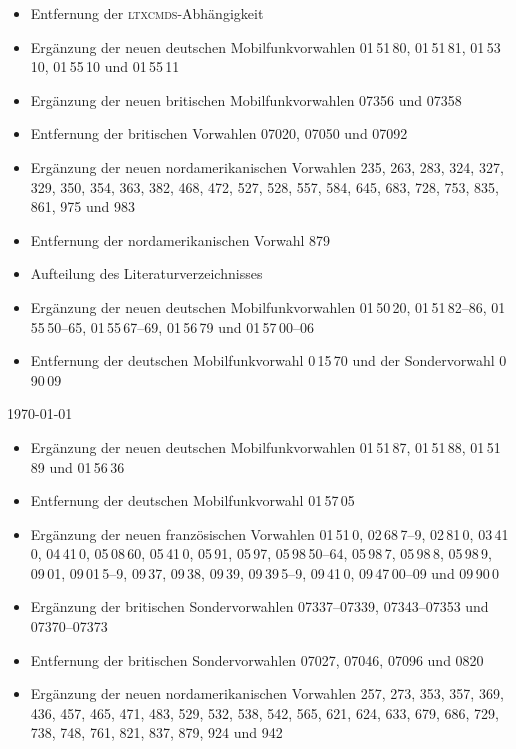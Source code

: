 \documentclass[numbers=noenddot]{scrreprt}
\newcommand*\Paket[1]{\textsc{#1}}
\begin{document}
\begin{description}
\begin{itemize}
\item Entfernung der \Paket{ltxcmds}-Abhängigkeit
\item Ergänzung der neuen deutschen Mobilfunkvorwahlen 01\,51\,80, 01\,51\,81, 01\,53\,10, 01\,55\,10 und 01\,55\,11
\item Ergänzung der neuen britischen Mobilfunkvorwahlen 07356 und 07358
\item Entfernung der britischen Vorwahlen 07020, 07050 und 07092
\item Ergänzung der neuen nordamerikanischen Vorwahlen 235, 263, 283, 324, 327, 329, 350, 354, 363, 382, 468, 472, 527, 528, 557, 584, 645, 683, 728, 753, 835, 861, 975 und 983
\item Entfernung der nordamerikanischen Vorwahl 879
\item Aufteilung des Literaturverzeichnisses
\end{itemize}
\item[2.6] 
\begin{itemize}
\item Ergänzung der neuen deutschen Mobilfunkvorwahlen 01\,50\,20, 01\,51\,82--86, 01\,55\,50--65, 01\,55\,67--69, 01\,56\,79 und 01\,57\,00--06
\item Entfernung der deutschen Mobilfunkvorwahl 0\,15\,70 und der Sondervorwahl  0\,90\,09
\end{itemize}
\item[2.7] \today
\begin{itemize}
\item Ergänzung der neuen deutschen Mobilfunkvorwahlen 01\,51\,87, 01\,51\,88, 01\,51\,89 und 01\,56\,36
\item Entfernung der deutschen Mobilfunkvorwahl 01\,57\,05
\item Ergänzung der neuen französischen Vorwahlen 01\,51\,0, 02\,68\,7--9, 02\,81\,0, 03\,41\,0, 04\,41\,0, 05\,08\,60, 05\,41\,0, 05\,91, 05\,97, 05\,98\,50--64, 05\,98\,7, 05\,98\,8, 05\,98\,9, 09\,01, 09\,01\,5--9, 09\,37, 09\,38, 09\,39, 09\,39\,5--9, 09\,41\,0, 09\,47\,00--09 und 09\,90\,0
\item Ergänzung der britischen Sondervorwahlen  07337--07339, 07343--07353 und 07370--07373
\item Entfernung der britischen Sondervorwahlen  07027, 07046, 07096 und 0820
\item Ergänzung der neuen nordamerikanischen Vorwahlen 257, 273, 353, 357, 369, 436, 457, 465, 471, 483, 529, 532, 538, 542, 565, 621, 624, 633, 679, 686, 729, 738, 748, 761, 821, 837, 879, 924 und 942
\end{itemize}
\end{description}
\end{document}
